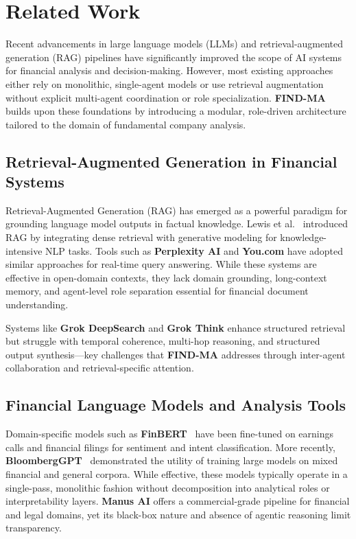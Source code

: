\documentclass[11pt]{article}
\begin{document}
\section{Related Work}
\label{sec:related}

Recent advancements in large language models (LLMs) and retrieval-augmented generation (RAG) pipelines have significantly improved the scope of AI systems for financial analysis and decision-making. However, most existing approaches either rely on monolithic, single-agent models or use retrieval augmentation without explicit multi-agent coordination or role specialization. \textbf{FIND-MA} builds upon these foundations by introducing a modular, role-driven architecture tailored to the domain of fundamental company analysis.

\subsection*{Retrieval-Augmented Generation in Financial Systems}

Retrieval-Augmented Generation (RAG) has emerged as a powerful paradigm for grounding language model outputs in factual knowledge. Lewis et al.~\cite{lewis2020retrieval} introduced RAG by integrating dense retrieval with generative modeling for knowledge-intensive NLP tasks. Tools such as \textbf{Perplexity AI} and \textbf{You.com} have adopted similar approaches for real-time query answering. While these systems are effective in open-domain contexts, they lack domain grounding, long-context memory, and agent-level role separation essential for financial document understanding.

Systems like \textbf{Grok DeepSearch} and \textbf{Grok Think} enhance structured retrieval but struggle with temporal coherence, multi-hop reasoning, and structured output synthesis—key challenges that \textbf{FIND-MA} addresses through inter-agent collaboration and retrieval-specific attention.

\subsection*{Financial Language Models and Analysis Tools}

Domain-specific models such as \textbf{FinBERT}~\cite{araci2019finbert} have been fine-tuned on earnings calls and financial filings for sentiment and intent classification. More recently, \textbf{BloombergGPT}~\cite{wu2023bloomberggpt} demonstrated the utility of training large models on mixed financial and general corpora. While effective, these models typically operate in a single-pass, monolithic fashion without decomposition into analytical roles or interpretability layers. \textbf{Manus AI} offers a commercial-grade pipeline for financial and legal domains, yet its black-box nature and absence of agentic reasoning limit transparency.
\end{document}
